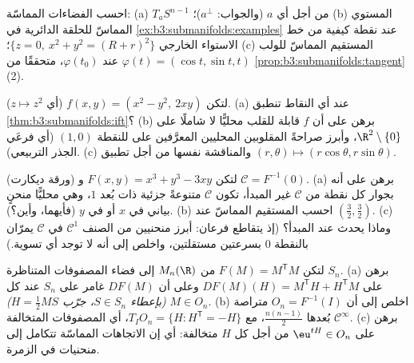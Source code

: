\begin{exercise}[$\star$]\label{exo:b3:submanifolds:2}
احسب الفضاءات المماسّة:
(a) $T_aS^{n-1}$ من أجل أي $a$ (والجواب: $a^\perp$)؛
(b) المستوي المماسّ للحلقة الدائرية في \cref{ex:b3:submanifolds:examples} عند نقطة
كيفية من خط الاستواء الخارجي $\{z = 0,\ x^2 + y^2 = (R + r)^2\}$؛
(c) المستقيم المماسّ للولب $\varphi(t) = (\cos t,
\sin t, t)$ عند $\varphi(t_0)$، متحققًا
من \cref{prop:b3:submanifolds:tangent}(2).
\end{exercise}

\begin{exercise}[$\star\star$]\label{exo:b3:submanifolds:3}
لتكن $f(x, y) = (x^2 - y^2,\ 2xy)$ (أي $z \mapsto z^2$).
(a) عند أي النقاط تنطبق \cref{thm:b3:submanifolds:ift}؟
(b) برهن على أن $f$ قابلة للقلب محليًّا لا شاملًا على $\R^2\setminus\{0\}$،
وأبرز صراحةً المقلوبين المحليين المعرَّفين على  للنقطة
$(1, 0)$ (أي فرعَي الجذر التربيعي).
(c) والمناقشة نفسها من أجل تطبيق  $(r,
\theta) \mapsto (r\cos\theta, r\sin\theta)$.
\end{exercise}

\begin{exercise}[$\star\star$]\label{exo:b3:submanifolds:4}
(ورقة ديكارت) لتكن $F(x,y) = x^3 + y^3 - 3xy$ و $\mathcal C =
F^{-1}(0)$.
(a) برهن على أنه بجوار كل نقطة من $\mathcal C$ غير المبدأ،
تكون $\mathcal C$ متنوعةً جزئية ذات بُعد $1$، وهي محليًّا منحنٍ
بياني في $x$ أو في $y$ (فأيهما، وأين؟).
(b) احسب المستقيم المماسّ عند $(\frac32, \frac32)$.
(c) وماذا يحدث عند المبدأ؟ (إذ يتقاطع فرعان: أبرز منحنيين من
الصنف $\mathcal C^1$ في $\mathcal C$ يمرّان بالنقطة $0$
بسرعتين مستقلتين، واخلص إلى أنه لا توجد أي تسوية.)
\end{exercise}

\begin{exercise}[$\star\star$]\label{exo:b3:submanifolds:5}
لتكن $F(M) = M^{\mathsf T}M$ من $M_n(\R)$ إلى فضاء المصفوفات المتناظرة $S_n$.
(a) برهن على $DF(M)(H) = M^{\mathsf T}H + H^{\mathsf T}M$ وعلى أن $DF(M)$ غامر على $S_n$ عند كل
$M \in O_n$ \emph{(بإعطاء $S \in S_n$، جرّب $H = \frac12MS$)}.
(b) اخلص إلى أن $O_n = F^{-1}(I)$  متراصة $\mathcal C^\infty$ بُعدها
$\frac{n(n-1)}2$، مع $T_IO_n = \{H : H^{\mathsf T} = -H\}$، أي المصفوفات المتخالفة.
(c) برهن على $\eu^{tH} \in O_n$ من أجل كل $H$ متخالفة: أي إن الاتجاهات
المماسّة تتكامل إلى منحنيات في الزمرة.
\end{exercise}

